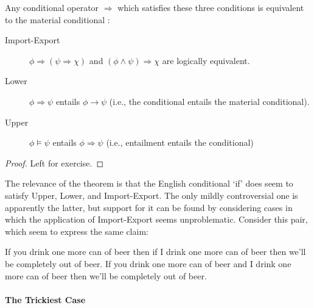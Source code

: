 \begin{theorem}[Gibbard]
Any conditional operator $\Rightarrow$ which satisfies these three conditions is equivalent to the material conditional \citep{gibbard}\label{gibb}:
\begin{description}
	\item[Import-Export] $\phi \Rightarrow (\psi \Rightarrow \chi)$ and $(\phi\wedge \psi)\Rightarrow \chi$ are logically equivalent.
\item[Lower] $\phi \Rightarrow \psi$ entails $\phi \to \psi$ (i.e., the conditional entails the material conditional).
\item[Upper] $\phi \vDash \psi$ entails $\phi \Rightarrow \psi$ (i.e., entailment entails the conditional)
\end{description}
\begin{proof}
	Left for exercise.
\end{proof}
\end{theorem}

The relevance of the theorem is that the English conditional `if' does seem to satisfy Upper, Lower, and Import-Export. The only mildly controversial one is apparently the latter, but support for it can be found by considering cases in which the application of Import-Export seems unproblematic. Consider this pair, which seem to express the same claim:
\begin{exe}
	\ex  \begin{xlist}
		\ex If you drink one more can of beer then if I drink one more can of beer then we’ll be completely out of beer.
	\ex If you drink one more can of beer and I drink one more can of beer then we’ll be completely out of beer. \citep[88]{kratzer}
	\end{xlist}
\end{exe}

\paragraph{The Trickiest Case}


